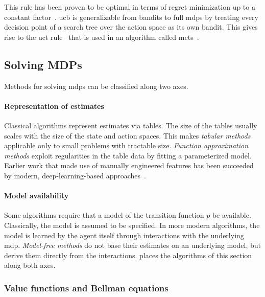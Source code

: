 This rule has been proven to be optimal in terms of regret minimization up to a constant factor~\cite{auer_finite-time_nodate}.
\Gls{ucb} is generalizable from bandits to full \glspl{mdp} by treating every decision point
of a search tree over the action space as its own bandit.
This gives rise to the \gls{uct} rule~\cite{hutchison_bandit_2006} that is used in an
algorithm called \gls{mcts}~\cite{hutchison_efficient_2007}.

\subsection{Solving MDPs}\label{sec:rl-solving}

Methods for solving \glspl{mdp} can be classified along two axes.

\paragraph{Representation of estimates}
Classical algorithms represent estimates via tables.
The size of the tables usually scales with the size of the state and action spaces.
This makes \emph{tabular methods} applicable only to small problems with tractable size.
\emph{Function approximation methods} exploit regularities in the table data by fitting a parameterized model.
Earlier work that made use of manually engineered features has been succeeded by modern, deep-learning-based approaches~\cite{sutton_reinforcement_2020,simsek_why_nodate,mnih_human-level_2015}.

\paragraph{Model availability}
Some algorithms require that a model of the transition function $p$ be available.
Classically, the model is assumed to be specified. In more modern algorithms,
the model is learned by the agent itself through interactions with the underlying \gls{mdp}.
\emph{Model-free methods} do not base their estimates on an underlying model, but
derive them directly from the interactions.
 places the algorithms of this section along both axes.



\subsubsection{Value functions and Bellman equations}\label{sec:rl-value-functions}

